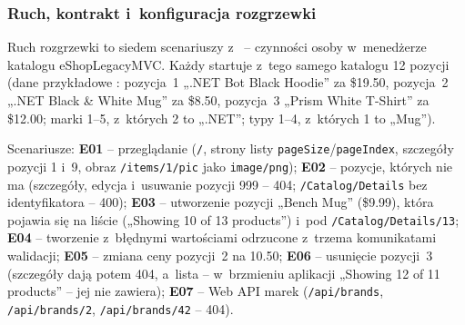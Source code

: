 
\subsubsection{Ruch, kontrakt i~konfiguracja rozgrzewki}\label{sec:bench-rozgrzewka-ruch}

Ruch rozgrzewki to siedem scenariuszy z~ --
czynności osoby w~menedżerze katalogu eShopLegacyMVC. Każdy startuje z~tego samego
katalogu 12 pozycji (dane przykładowe : pozycja~1 „.NET Bot
Black Hoodie” za \$19.50, pozycja~2 „.NET Black \& White Mug” za \$8.50, pozycja~3
„Prism White T-Shirt” za \$12.00; marki 1--5, z~których 2 to „.NET”; typy 1--4,
z~których 1 to „Mug”).

Scenariusze: \textbf{E01} -- przeglądanie (\texttt{/}, strony listy
\texttt{pageSize}/\texttt{pageIndex}, szczegóły pozycji 1 i~9, obraz
\texttt{/items/1/pic} jako \texttt{image/png}); \textbf{E02} -- pozycje, których nie ma
(szczegóły, edycja i~usuwanie pozycji 999 -- 404; \texttt{/Catalog/Details} bez
identyfikatora -- 400); \textbf{E03} -- utworzenie pozycji „Bench Mug” (\$9.99), która
pojawia się na liście („Showing 10 of 13 products”) i~pod \texttt{/Catalog/Details/13};
\textbf{E04} -- tworzenie z~błędnymi wartościami odrzucone z~trzema komunikatami walidacji;
\textbf{E05} -- zmiana ceny pozycji~2 na 10.50; \textbf{E06} -- usunięcie pozycji~3
(szczegóły dają potem 404, a~lista -- w~brzmieniu aplikacji „Showing 12 of 11 products”
-- jej nie zawiera); \textbf{E07} -- Web API marek (\texttt{/api/brands},
\texttt{/api/brands/2}, \texttt{/api/brands/42} -- 404).

